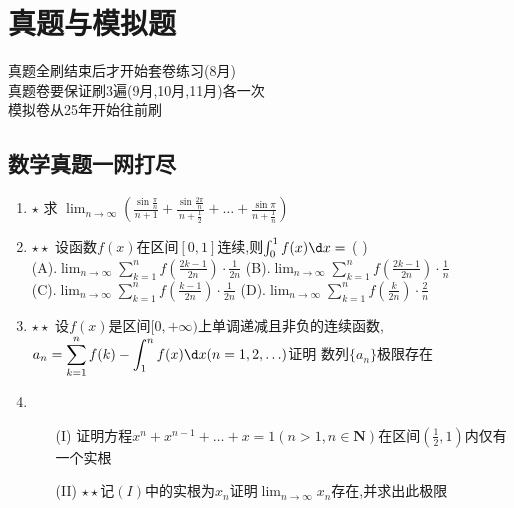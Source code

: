 \documentclass[12pt, a4paper, oneside, UTF8]{ctexbook}
\begin{document}
% 
\else
\fi
\chapter{真题与模拟题}
\begin{tcolorbox}
    真题全刷结束后才开始套卷练习(8月)\\
    真题卷要保证刷3遍(9月,10月,11月)各一次 \\
    模拟卷从25年开始往前刷
\end{tcolorbox}
\section{数学真题一网打尽} 
\begin{enumerate}
    \item $\star$ 求 $\displaystyle \lim_{n\to\infty}\left(\frac{\sin\frac{\pi}{n}}{n+1}+
    \frac{\sin\frac{2\pi}{n}}{n+\frac{1}{2}}+\ldots+\frac{\sin\pi}{n+\frac{1}{n}}\right)$ 

    \answer{
        \begin{solution}
        
        \end{solution}
    }
    
    \item $\star\star$ 设函数$f(x)$在区间$\left[0,1\right]$连续,则$\int_{0}^{1}f(x)\d x = $ (   ) \\
    (A).$\displaystyle\lim_{n\to\infty}\sum_{k=1}^{n}f\left(\frac{2k-1}{2n}\right)\cdot\frac{1}{2n}$\qquad
    (B).$\displaystyle\lim_{n\to\infty}\sum_{k=1}^{n}f\left(\frac{2k-1}{2n}\right)\cdot\frac{1}{n}$\\
    (C).$\displaystyle\lim_{n\to\infty}\sum_{k=1}^{n}f\left(\frac{k-1}{2n}\right)\cdot\frac{1}{2n}$\qquad
    (D).$\displaystyle\lim_{n\to\infty}\sum_{k=1}^{n}f\left(\frac{k}{2n}\right)\cdot\frac{2}{n}$\qquad

    \item $\star\star$ 设$f(x)$是区间$[0,+\infty)$上单调递减且非负的连续函数,$\displaystyle a_n=\sum_{k=1}^{n}f(k)-\int_{1}^{n}f(x)\d x(n=1,2,\ldots)$证明
    数列$\{a_n\}$极限存在 

    \item 
    \begin{enumerate}
        \item [(I)] 证明方程$x^{n}+x^{n-1}+\ldots+x=1(n>1,n\in\mathbf{N})$在区间$\left(\frac{1}{2},1\right)$内仅有一个实根 
        \item [(II)] $\star\star$记$(I)$中的实根为$x_n$证明$\displaystyle \lim_{n\to\infty}x_n$存在,并求出此极限 
    \end{enumerate}


\end{enumerate}
\end{document}
